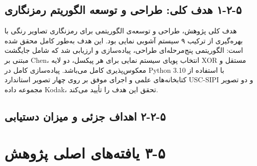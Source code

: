 \subsection{‏۵‏-‏۲‏-‏۱‏ هدف کلی: طراحی و توسعه الگوریتم رمزنگاری}

هدف کلی پژوهش، طراحی و توسعه‌ی الگوریتمی برای رمزنگاری تصاویر رنگی با بهره‌گیری از ترکیب ۹ سیستم آشوبی نمایی بود. این هدف به‌طور کامل محقق شده است: الگوریتمی پنج‌مرحله‌ای طراحی، پیاده‌سازی و ارزیابی شد که شامل جایگشت مبتنی بر Chen، انتخاب پویای سیستم نمایی برای هر پیکسل، دو لایه XOR مستقل و معکوس‌پذیری کامل می‌باشد. پیاده‌سازی کامل در Python 3.10{} با استفاده از کتابخانه‌های علمی و اجرای موفق بر روی چهار تصویر استاندارد USC-SIPI و دو تصویر مجموعه داده Kodak، تحقق این هدف را تأیید می‌کند.

\subsection{‏۵‏-‏۲‏-‏۲‏ اهداف جزئی و میزان دستیابی}

\begin{table}[h]
\centering
\footnotesize
{}
\caption{جدول ‏۵‏-‏۱‏: ارزیابی میزان تحقق اهداف جزئی پژوهش}
\end{table}

\section{‏۵‏-‏۳‏ یافته‌های اصلی پژوهش}


